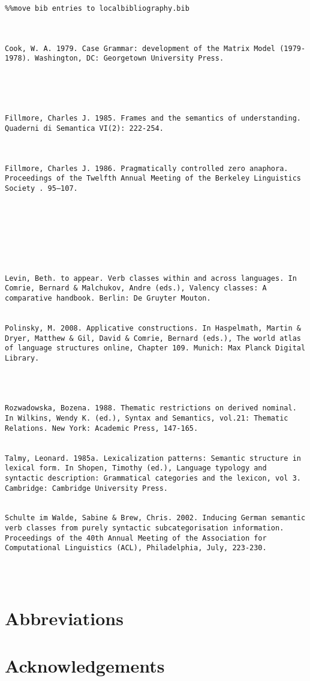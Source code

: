 \documentclass[output=paper]{langsci/langscibook}
\begin{document}
\begin{verbatim}%%move bib entries to localbibliography.bib



Cook, W. A. 1979. Case Grammar: development of the Matrix Model (1979-1978). Washington, DC: Georgetown University Press.





Fillmore, Charles J. 1985. Frames and the semantics of understanding. Quaderni di Semantica VI(2): 222-254.



Fillmore, Charles J. 1986. Pragmatically controlled zero anaphora. Proceedings of the Twelfth Annual Meeting of the Berkeley Linguistics Society . 95–107.








Levin, Beth. to appear. Verb classes within and across languages. In Comrie, Bernard & Malchukov, Andre (eds.), Valency classes: A comparative handbook. Berlin: De Gruyter Mouton.


Polinsky, M. 2008. Applicative constructions. In Haspelmath, Martin & Dryer, Matthew & Gil, David & Comrie, Bernard (eds.), The world atlas of language structures online, Chapter 109. Munich: Max Planck Digital Library.




Rozwadowska, Bozena. 1988. Thematic restrictions on derived nominal. In Wilkins, Wendy K. (ed.), Syntax and Semantics, vol.21: Thematic Relations. New York: Academic Press, 147-165.


Talmy, Leonard. 1985a. Lexicalization patterns: Semantic structure in lexical form. In Shopen, Timothy (ed.), Language typology and syntactic description: Grammatical categories and the lexicon, vol 3. Cambridge: Cambridge University Press.


Schulte im Walde, Sabine & Brew, Chris. 2002. Inducing German semantic verb classes from purely syntactic subcategorisation information. Proceedings of the 40th Annual Meeting of the Association for Computational Linguistics (ACL), Philadelphia, July, 223-230.




\end{verbatim}

\section*{Abbreviations}
\section*{Acknowledgements}

\printbibliography[heading=subbibliography,notkeyword=this]
\end{document}
